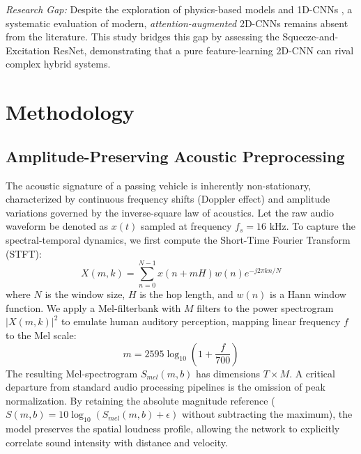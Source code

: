 \documentclass[conference]{IEEEtran}
\begin{document}
\textit{Research Gap:} Despite the exploration of physics-based models \cite{ref13} and 1D-CNNs \cite{ref4}, a systematic evaluation of modern, \textit{attention-augmented} 2D-CNNs remains absent from the literature. This study bridges this gap by assessing the Squeeze-and-Excitation ResNet, demonstrating that a pure feature-learning 2D-CNN can rival complex hybrid systems.


\section{Methodology}

\subsection{Amplitude-Preserving Acoustic Preprocessing}
The acoustic signature of a passing vehicle is inherently non-stationary, characterized by continuous frequency shifts (Doppler effect) and amplitude variations governed by the inverse-square law of acoustics. Let the raw audio waveform be denoted as $x(t)$ sampled at frequency $f_s = 16$ kHz. To capture the spectral-temporal dynamics, we first compute the Short-Time Fourier Transform (STFT):
\begin{equation}
    X(m, k) = \sum_{n=0}^{N-1} x(n + mH) w(n) e^{-j 2\pi k n / N}
\end{equation}
where $N$ is the window size, $H$ is the hop length, and $w(n)$ is a Hann window function. We apply a Mel-filterbank with $M$ filters to the power spectrogram $|X(m,k)|^2$ to emulate human auditory perception, mapping linear frequency $f$ to the Mel scale:
\begin{equation}
    m = 2595 \log_{10}\left(1 + \frac{f}{700}\right)
\end{equation}
The resulting Mel-spectrogram $S_{mel}(m, b)$ has dimensions $T \times M$. A critical departure from standard audio processing pipelines is the omission of peak normalization. By retaining the absolute magnitude reference ($S(m,b) = 10 \log_{10}(S_{mel}(m,b) + \epsilon)$ without subtracting the maximum), the model preserves the spatial loudness profile, allowing the network to explicitly correlate sound intensity with distance and velocity.
\end{document}
